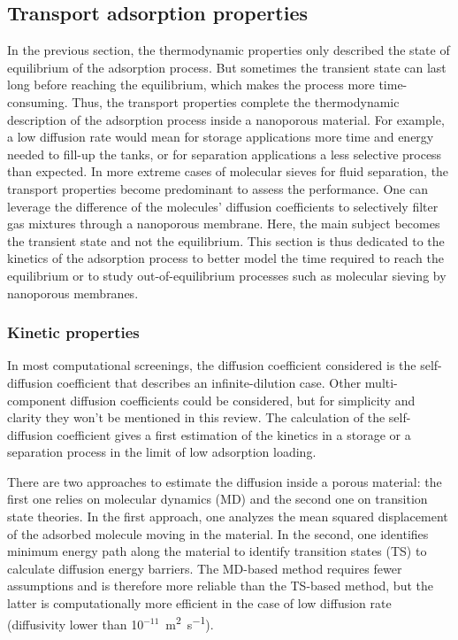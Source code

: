\documentclass[main.tex]{subfiles}
\begin{document}
\subsection{Transport adsorption properties}

In the previous section, the thermodynamic properties only described the state of equilibrium of the adsorption process. But sometimes the transient state can last long before reaching the equilibrium, which makes the process more time-consuming. Thus, the transport properties complete the thermodynamic description of the adsorption process inside a nanoporous material. For example, a low diffusion rate would mean for storage applications more time and energy needed to fill-up the tanks, or for separation applications a less selective process than expected. In more extreme cases of molecular sieves for fluid separation, the transport properties become predominant to assess the performance. One can leverage the difference of the molecules' diffusion coefficients to selectively filter gas mixtures through a nanoporous membrane.\cite{Miandoab_2021} Here, the main subject becomes the transient state and not the equilibrium. This section is thus dedicated to the kinetics of the adsorption process to better model the time required to reach the equilibrium or to study out-of-equilibrium processes such as molecular sieving by nanoporous membranes.

\subsubsection{Kinetic properties}

In most computational screenings, the diffusion coefficient considered is the self-diffusion coefficient that describes an infinite-dilution case. Other multi-component diffusion coefficients could be considered, but for simplicity and clarity they won't be mentioned in this review. The calculation of the self-diffusion coefficient gives a first estimation of the kinetics in a storage or a separation process in the limit of low adsorption loading.

There are two approaches to estimate the diffusion inside a porous material: the first one relies on molecular dynamics (MD) and the second one on transition state theories. In the first approach, one analyzes the mean squared displacement of the adsorbed molecule moving in the material. In the second, one identifies minimum energy path along the material to identify transition states (TS) to calculate diffusion energy barriers. The MD-based method requires {fewer} assumptions and is therefore more reliable than the TS-based method, but the latter is computationally more efficient in the case of low diffusion rate (diffusivity lower than 10$^{-11}$~\si{\square\meter\per\second}).
\end{document}
